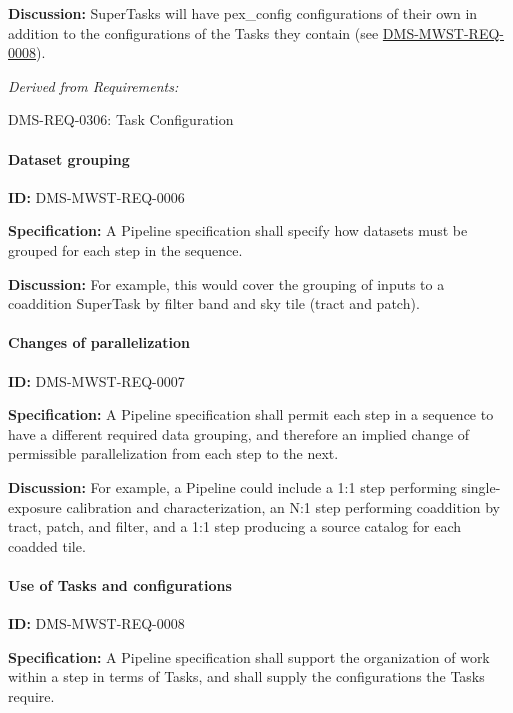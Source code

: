 \documentclass[SE,toc,lsstdraft]{lsstdoc}
\begin{document}
\textbf{Discussion:}
SuperTasks will have pex\_config configurations of their own in addition to the configurations of the Tasks they contain (see \hyperref[DMS-MWST-REQ-0008]{DMS-MWST-REQ-0008}).

\emph{Derived from Requirements:}

DMS-REQ-0306:
Task Configuration \newline

\paragraph{Dataset grouping}\hfill  %

\label{DMS-MWST-REQ-0006}
\textbf{ID:} DMS-MWST-REQ-0006

\textbf{Specification:}
A Pipeline specification shall specify how datasets must be grouped for each step in the sequence.

\textbf{Discussion:}
For example, this would cover the grouping of inputs to a coaddition SuperTask by filter band and sky tile (tract and patch).

\paragraph{Changes of parallelization}\hfill  %

\label{DMS-MWST-REQ-0007}
\textbf{ID:} DMS-MWST-REQ-0007

\textbf{Specification:}
A Pipeline specification shall permit each step in a sequence to have a different required data grouping, and therefore an implied change of permissible parallelization from each step to the next.

\textbf{Discussion:}
For example, a Pipeline could include a 1:1 step performing single-exposure calibration and characterization, an N:1 step performing coaddition by tract, patch, and filter, and a 1:1 step producing a source catalog for each coadded tile.

\paragraph{Use of Tasks and configurations}\hfill  %

\label{DMS-MWST-REQ-0008}
\textbf{ID:} DMS-MWST-REQ-0008

\textbf{Specification:}
A Pipeline specification shall support the organization of work within a step in terms of Tasks, and shall supply the configurations the Tasks require.
\end{document}
